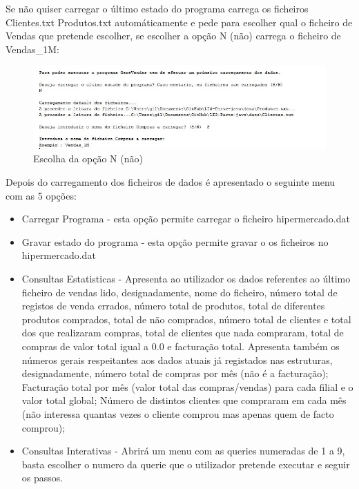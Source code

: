 Se não quiser carregar o último estado do programa carrega os ficheiros Clientes.txt Produtos.txt automáticamente e pede para escolher qual o ficheiro de Vendas que pretende escolher, se escolher a opção N (não) carrega o ficheiro de Vendas\_1M: 

\begin{figure}[h!]
	\includegraphics[scale=0.65]{menunao.jpg}  
	\caption{Escolha da opção N (não) }  
\end{figure}

Depois do carregamento dos ficheiros de dados é apresentado o seguinte menu com as 5 opções: 


\begin{itemize}
	\item Carregar Programa - esta opção permite carregar o ficheiro hipermercado.dat
	\item Gravar estado do programa - esta opção permite gravar o os ficheiros no hipermercado.dat 
	\item Consultas Estatisticas - Apresenta ao utilizador os dados referentes ao último ficheiro de vendas lido,
	designadamente, nome do ficheiro, número total de registos de venda errados,
	número total de produtos, total de diferentes produtos comprados, total de não
	comprados, número total de clientes e total dos que realizaram compras, total de
	clientes que nada compraram, total de compras de valor total igual a 0.0 e
	facturação total. Apresenta também os números gerais respeitantes aos dados
	atuais já registados nas estruturas, designadamente, número total de compras por mês (não é a facturação); Facturação total por mês (valor total das compras/vendas) para cada filial e o valor total global; Número de distintos clientes que compraram em cada mês (não interessa quantas vezes o cliente comprou mas apenas quem de facto comprou); 

	\item Consultas Interativas  - Abrirá um menu com as queries numeradas de 1 a 9, basta escolher o numero da querie que o utilizador pretende executar e seguir os passos. 
\end{itemize}

